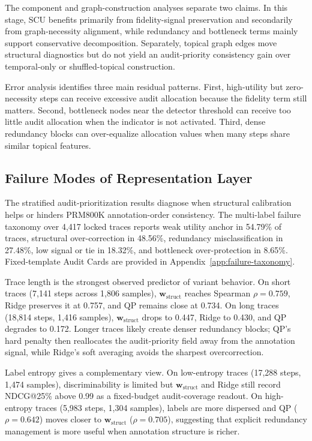 \documentclass[a4paper,fleqn]{cas-sc}
\newcommand{\wstruct}{\ensuremath{\mathbf{w}_{\mathrm{struct}}}}
\begin{document}
The component and graph-construction analyses separate two claims. In this stage, SCU benefits primarily from fidelity-signal preservation and secondarily from graph-necessity alignment, while redundancy and bottleneck terms mainly support conservative decomposition. Separately, topical graph edges move structural diagnostics but do not yield an audit-priority consistency gain over temporal-only or shuffled-topical construction.

Error analysis identifies three main residual patterns. First, high-utility but zero-necessity steps can receive excessive audit allocation because the fidelity term still matters. Second, bottleneck nodes near the detector threshold can receive too little audit allocation when the indicator is not activated. Third, dense redundancy blocks can over-equalize allocation values when many steps share similar topical features.

\subsection{Failure Modes of Representation Layer}
\label{sec:prm800k-error}

The stratified audit-prioritization results diagnose when structural calibration helps or hinders PRM800K annotation-order consistency. The multi-label failure taxonomy over 4,417 locked traces reports weak utility anchor in 54.79\% of traces, structural over-correction in 48.56\%, redundancy misclassification in 27.48\%, low signal or tie in 18.32\%, and bottleneck over-protection in 8.65\%. Fixed-template Audit Cards are provided in Appendix~\ref{app:failure-taxonomy}.

Trace length is the strongest observed predictor of variant behavior. On short traces (7,141 steps across 1,806 samples), \wstruct{} reaches Spearman $\rho = 0.759$, Ridge preserves it at 0.757, and QP remains close at 0.734. On long traces (18,814 steps, 1,416 samples), \wstruct{} drops to 0.447, Ridge to 0.430, and QP degrades to 0.172. Longer traces likely create denser redundancy blocks; QP's hard penalty then reallocates the audit-priority field away from the annotation signal, while Ridge's soft averaging avoids the sharpest overcorrection.

Label entropy gives a complementary view. On low-entropy traces (17,288 steps, 1,474 samples), discriminability is limited but \wstruct{} and Ridge still record NDCG@25\% above 0.99 as a fixed-budget audit-coverage readout. On high-entropy traces (5,983 steps, 1,304 samples), labels are more dispersed and QP ($\rho = 0.642$) moves closer to \wstruct{} ($\rho = 0.705$), suggesting that explicit redundancy management is more useful when annotation structure is richer.
\end{document}
